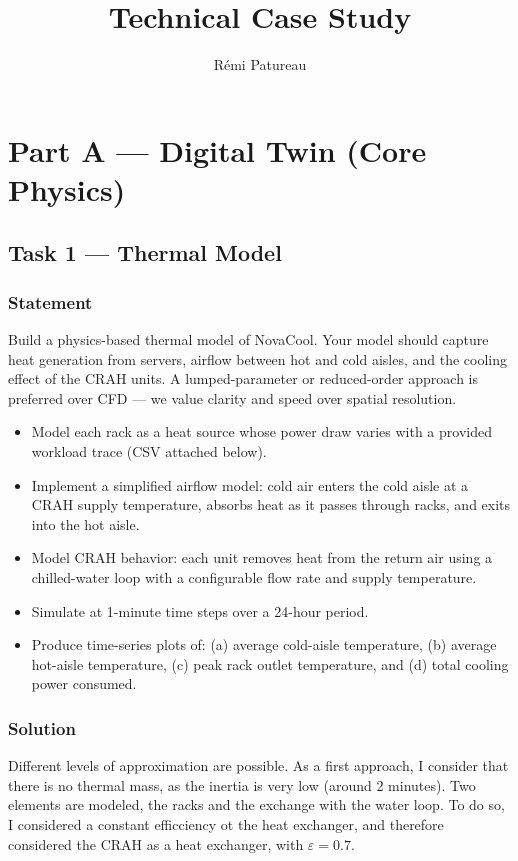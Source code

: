 \documentclass[letterpaper,11pt]{article}
\title{Technical Case Study}
\author{Rémi Patureau}
\date{}
\begin{document}
	
	\maketitle
	
	\section{Part A — Digital Twin (Core Physics)}
	
	\subsection{Task 1 — Thermal Model}
	
	\subsubsection{Statement}
	
	Build a physics-based thermal model of NovaCool. Your model should capture heat generation
	from servers, airflow between hot and cold aisles, and the cooling effect of the CRAH units. A
	lumped-parameter or reduced-order approach is preferred over CFD — we value clarity and speed
	over spatial resolution.
	\begin{itemize}[label=--]
	\item Model each rack as a heat source whose power draw varies with a provided workload trace
	(CSV attached below).
	\item Implement a simplified airflow model: cold air enters the cold aisle at a CRAH supply
	temperature, absorbs heat as it passes through racks, and exits into the hot aisle.
	\item Model CRAH behavior: each unit removes heat from the return air using a chilled-water loop
	with a configurable flow rate and supply temperature.
	\item Simulate at 1-minute time steps over a 24-hour period.
	\item Produce time-series plots of: (a) average cold-aisle temperature, (b) average hot-aisle
	temperature, (c) peak rack outlet temperature, and (d) total cooling power consumed.
	\end{itemize}

	\subsubsection{Solution}
	
	Different levels of approximation are possible. As a first approach, I consider that there is no thermal mass, as the inertia is very low (around 2 minutes). Two elements are modeled, the racks and the exchange with the water loop. To do so, I considered a constant efficciency ot the heat exchanger, and therefore considered the CRAH as a heat exchanger, with $\varepsilon = 0.7$.
	
\end{document}
